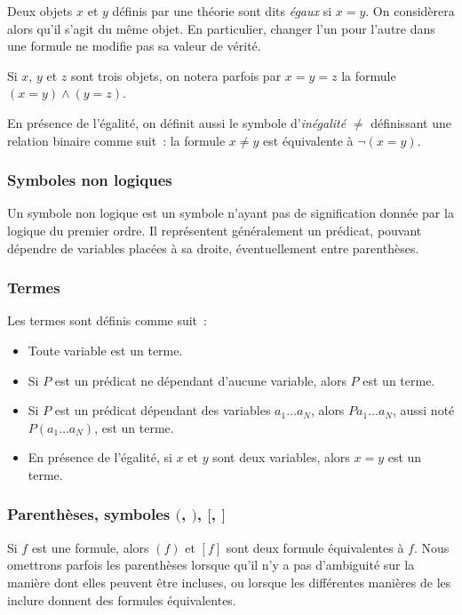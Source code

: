 Deux objets $x$ et $y$ définis par une théorie sont dits \textit{égaux} si $x = y$. 
On considèrera alors qu'il s'agit du même objet. 
En particulier, changer l'un pour l'autre dans une formule ne modifie pas sa valeur de vérité.

Si $x$, $y$ et $z$ sont trois objets, on notera parfois par $x = y = z$ la formule $(x = y) \wedge (y = z)$. 

En présence de l'égalité, on définit aussi le symbole d'\textit{inégalité} $\neq$ définissant une relation binaire comme suit : la formule $x \neq y$ est équivalente à $\neg (x = y)$.

\subsubsection{Symboles non logiques}

Un symbole non logique est un symbole n'ayant pas de signification donnée par la logique du premier ordre. 
Il représentent généralement un prédicat, pouvant dépendre de variables placées à sa droite, éventuellement entre parenthèses.

\subsubsection{Termes}

Les termes sont définis comme suit : 
\begin{itemize}
    \item Toute variable est un terme. 
    \item Si $P$ est un prédicat ne dépendant d'aucune variable, alors $P$ est un terme.
    \item Si $P$ est un prédicat dépendant des variables $a_1 \dots a_N$, alors $P a_1 \dots a_N$, aussi noté $P (a_1 \dots a_N)$, est un terme. 
    \item En présence de l'égalité, si $x$ et $y$ sont deux variables, alors $x = y$ est un terme.
\end{itemize}

\subsubsection{Parenthèses, symboles $($, $)$, $[$, $]$}

\sindex[isy]{$($}\sindex[isy]{$)$}\sindex[isy]{$[$}\sindex[isy]{$]$}
Si $f$ est une formule, alors $(f)$ et $[f]$ sont deux formule équivalentes à $f$. 
Nous omettrons parfois les parenthèses lorsque qu'il n'y a pas d'ambiguité sur la manière dont elles peuvent être incluses, ou lorsque les différentes manières de les inclure donnent des formules équivalentes. 

